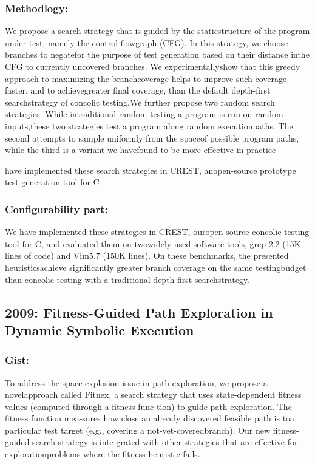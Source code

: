 \documentclass[	runningheads,
				a4paper]{llncs}
\begin{document}
\subsubsection{Methodlogy:}
We  propose  a  search  strategy  that  is  guided  by  the  staticstructure  of  the  program  under  test,  namely  the  control  flowgraph  (CFG).  In  this  strategy,  we  choose  branches  to  negatefor  the  purpose  of  test  generation  based  on  their  distance  inthe CFG to currently uncovered branches. We experimentallyshow  that  this  greedy  approach  to  maximizing  the  branchcoverage helps to improve such coverage faster, and to achievegreater   final   coverage,   than   the   default   depth-first   searchstrategy of concolic testing.We further propose two random search strategies. While intraditional random testing a program is run on random inputs,these  two  strategies  test  a  program  along  random  executionpaths. The second attempts to sample uniformly from the spaceof possible program paths, while the third is a variant we havefound to be more effective in practice

have implemented these search strategies in CREST, anopen-source prototype test generation tool for C

\subsubsection{Configurability part:}
We have implemented these strategies in CREST, ouropen source concolic testing tool for C, and evaluated them on twowidely-used software tools, grep 2.2 (15K lines of code) and Vim5.7 (150K lines). On these benchmarks, the presented heuristicsachieve significantly greater branch coverage on the same testingbudget than concolic testing with a traditional depth-first searchstrategy.


\subsection{2009: Fitness-Guided Path Exploration in Dynamic Symbolic Execution}

\subsubsection{Gist:}
To address the space-explosion  issue  in  path  exploration,  we  propose  a  novelapproach called Fitnex, a search strategy that uses state-dependent fitness values (computed through a fitness func-tion) to guide path exploration.  The fitness function mea-sures how close an already discovered feasible path is toa  particular  test  target  (e.g.,  covering  a  not-yet-coveredbranch).   Our new fitness-guided search strategy is  inte-grated with other strategies that are effective for explorationproblems where the fitness heuristic fails.
\end{document}
